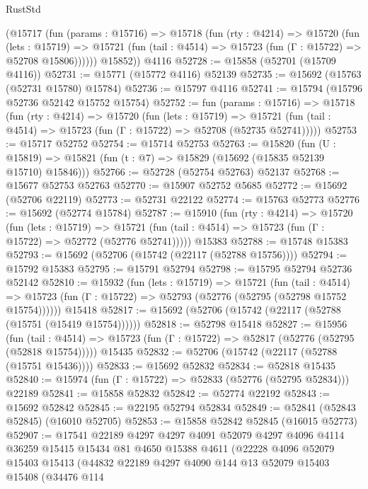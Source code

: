 \begin{lexlean}{RustStd}
\begin{coremodule}
        (@15717
          (fun (params : @15716) =>
          @15718
            (fun (rty : @4214) =>
            @15720
              (fun (lets : @15719) =>
              @15721 (fun (tail : @4514) => @15723 (fun (Γ : @15722) => @52708 @15806))))))
        @15852))
    @4116
@52728 := @15858 (@52701 (@15709 @4116))
@52731 := @15771 (@15772 @4116) @52139
@52735 := @15692 (@15763 (@52731 @15780) @15784)
@52736 := @15797 @4116
@52741 := @15794 (@15796 @52736 @52142 @15752 @15754)
@52752 := fun (params : @15716) =>
  @15718
    (fun (rty : @4214) =>
    @15720
      (fun (lets : @15719) =>
      @15721 (fun (tail : @4514) => @15723 (fun (Γ : @15722) => @52708 (@52735 @52741)))))
@52753 := @15717 @52752
@52754 := @15714 @52753
@52763 := @15820
    (fun (U : @15819) => @15821 (fun (t : @7) => @15829 (@15692 (@15835 @52139 @15710) @15846)))
@52766 := @52728 (@52754 @52763) @52137
@52768 := @15677 @52753 @52763
@52770 := @15907 @52752 @5685
@52772 := @15692 (@52706 @22119)
@52773 := @52731 @22122
@52774 := @15763 @52773
@52776 := @15692 (@52774 @15784)
@52787 := @15910
    (fun (rty : @4214) =>
    @15720
      (fun (lets : @15719) =>
      @15721 (fun (tail : @4514) => @15723 (fun (Γ : @15722) => @52772 (@52776 @52741)))))
    @15383
@52788 := @15748 @15383
@52793 := @15692 (@52706 (@15742 (@22117 (@52788 @15756))))
@52794 := @15792 @15383
@52795 := @15791 @52794
@52798 := @15795 @52794 @52736 @52142
@52810 := @15932
    (fun (lets : @15719) =>
    @15721
      (fun (tail : @4514) =>
      @15723 (fun (Γ : @15722) => @52793 (@52776 (@52795 (@52798 @15752 @15754))))))
    @15418
@52817 := @15692 (@52706 (@15742 (@22117 (@52788 (@15751 (@15419 @15754))))))
@52818 := @52798 @15418
@52827 := @15956
    (fun (tail : @4514) => @15723 (fun (Γ : @15722) => @52817 (@52776 (@52795 (@52818 @15754)))))
    @15435
@52832 := @52706 (@15742 (@22117 (@52788 (@15751 @15436))))
@52833 := @15692 @52832
@52834 := @52818 @15435
@52840 := @15974 (fun (Γ : @15722) => @52833 (@52776 (@52795 @52834))) @22189
@52841 := @15858 @52832
@52842 := @52774 @22192
@52843 := @15692 @52842
@52845 := @22195 @52794 @52834
@52849 := @52841 (@52843 @52845) (@16010 @52705)
@52853 := @15858 @52842 @52845 (@16015 @52773)
@52907 := @17541
    @22189
    @4297
    @4297
    @4091
    @52079
    @4297
    @4096
    @4114
    @36259
    @15415
    @15434
    @81
    @4650
    @15388
    @4611
    (@22228
      @4096
      @52079
      @15403
      @15413
      (@44832
        @22189
        @4297
        @4090
        @144
        @13
        @52079
        @15403
        @15408
        (@34476
          @114

\end{coremodule}
\end{lexlean}
